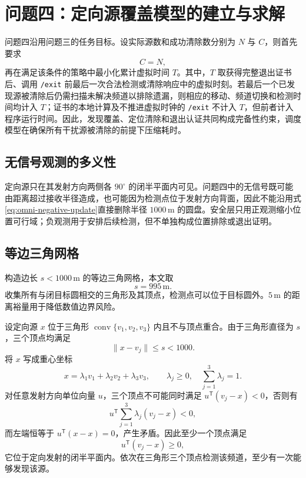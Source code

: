 \section{问题四：定向源覆盖模型的建立与求解}

问题四沿用问题三的任务目标。设实际源数和成功清除数分别为 $N$ 与 $C$，则首先要求
\begin{equation}
  C=N,
\end{equation}
再在满足该条件的策略中最小化累计虚拟时间 $T$。其中，$T$ 取获得完整退出证书后、调用 \texttt{/exit} 前最后一次合法检测或清除响应中的虚拟时刻。若最后一个已发现源被清除后仍需扫描未解决频道以排除遗漏，则相应的移动、频道切换和检测时间均计入 $T$；证书的本地计算及不推进虚拟时钟的 \texttt{/exit} 不计入 $T$，但前者计入程序运行时间。因此，发现覆盖、定位清除和退出认证共同构成完备性约束，调度模型在确保所有干扰源被清除的前提下压缩耗时。

\subsection{无信号观测的多义性}
定向源只在其发射方向两侧各 $90^\circ$ 的闭半平面内可见。问题四中的无信号既可能由距离超过接收半径造成，也可能因为检测点位于发射方向背面，因此不能沿用式\eqref{eq:omni-negative-update}直接删除半径 $1000\,\mathrm{m}$ 的圆盘。安全层只用正观测缩小位置可行域；负观测用于安排后续检测，但不单独构成位置排除或退出证明。

\subsection{等边三角网格}
构造边长 $s<1000\,\mathrm{m}$ 的等边三角网格，本文取
\begin{equation}
  s=995\,\mathrm{m}.
\end{equation}
收集所有与闭目标圆相交的三角形及其顶点，检测点可以位于目标圆外。$5\,\mathrm{m}$ 的距离裕量用于降低数值边界风险。

设定向源 $x$ 位于三角形 $\operatorname{conv}\{v_1,v_2,v_3\}$ 内且不与顶点重合。由于三角形直径为 $s$，三个顶点均满足
\begin{equation}
  \|x-v_j\|\leq s<1000.
\end{equation}
将 $x$ 写成重心坐标
\begin{equation}
  x=\lambda_1v_1+\lambda_2v_2+\lambda_3v_3,
  \qquad \lambda_j\geq0,
  \quad \sum_{j=1}^{3}\lambda_j=1.
\end{equation}
对任意发射方向单位向量 $u$，三个顶点不可能同时满足 $u^{\mathsf T}(v_j-x)<0$，否则有
\begin{equation}
  u^{\mathsf T}\sum_{j=1}^{3}\lambda_j(v_j-x)<0,
\end{equation}
而左端恒等于 $u^{\mathsf T}(x-x)=0$，产生矛盾。因此至少一个顶点满足
\begin{equation}
  u^{\mathsf T}(v_j-x)\geq0,
\end{equation}
它位于定向发射的闭半平面内。依次在三角形三个顶点检测该频道，至少有一次能够发现该源。

